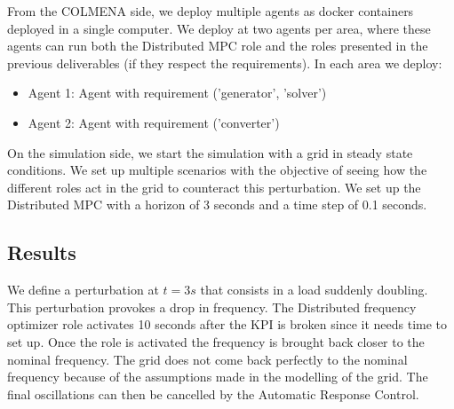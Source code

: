 \documentclass{article}
\begin{document}
From the COLMENA side, we deploy multiple agents as docker containers deployed in a single computer. We deploy at two agents per area, where these agents can run both the Distributed MPC role and the roles presented in the previous deliverables (if they respect the requirements). In each area we deploy:

\begin{itemize}
    \item Agent 1: Agent with requirement ('generator', 'solver') 
    \item Agent 2: Agent with requirement ('converter') 
\end{itemize}

On the simulation side, we start the simulation with a grid in steady state conditions. We set up multiple scenarios with the objective of seeing how the different roles act in the grid to counteract this perturbation. We set up the Distributed MPC with a horizon of 3 seconds and a time step of 0.1 seconds.

\subsection{Results}

We define a perturbation at $t=3s$ that consists in a load suddenly doubling. This perturbation provokes a drop in frequency. The Distributed frequency optimizer role activates 10 seconds after the KPI is broken since it needs time to set up. Once the role is activated the frequency is brought back closer to the nominal frequency. The grid does not come back perfectly to the nominal frequency because of the assumptions made in the modelling of the grid. The final oscillations can then be cancelled by the Automatic Response Control.
\end{document}
